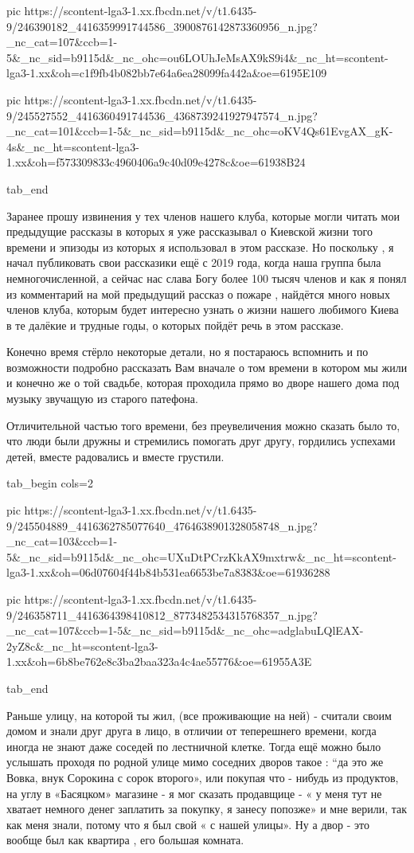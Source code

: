      pic https://scontent-lga3-1.xx.fbcdn.net/v/t1.6435-9/246390182_4416359991744586_3900876142873360956_n.jpg?_nc_cat=107&ccb=1-5&_nc_sid=b9115d&_nc_ohc=ou6LOUhJeMsAX9kS9i4&_nc_ht=scontent-lga3-1.xx&oh=c1f9fb4b082bb7e64a6ea28099fa442a&oe=6195E109

     pic https://scontent-lga3-1.xx.fbcdn.net/v/t1.6435-9/245527552_4416360491744536_4368739241927947574_n.jpg?_nc_cat=101&ccb=1-5&_nc_sid=b9115d&_nc_ohc=oKV4Qs61EvgAX_gK-4s&_nc_ht=scontent-lga3-1.xx&oh=f573309833c4960406a9c40d09e4278c&oe=61938B24

  tab_end
\fi

Заранее прошу извинения у тех членов нашего клуба, которые могли читать мои
предыдущие рассказы в которых я  уже  рассказывал о Киевской жизни того времени
и эпизоды из которых я использовал в этом рассказе. Но поскольку , я начал
публиковать свои рассказики ещё с 2019 года, когда наша группа была
немногочисленной, а сейчас нас слава Богу  более 100 тысяч членов и как я понял
из комментарий на мой предыдущий рассказ о пожаре ,  найдётся много новых
членов клуба, которым будет интересно узнать о жизни нашего любимого Киева в те
далёкие и трудные годы, о которых пойдёт речь в этом рассказе.

Конечно время стёрло некоторые детали, но я постараюсь вспомнить и по
возможности  подробно рассказать Вам вначале о том времени в котором мы жили и
конечно же о той свадьбе, которая проходила прямо во дворе нашего дома под
музыку звучащую из старого патефона.

Отличительной частью того времени, без преувеличения можно сказать было то, что
люди были  дружны и стремились помогать друг другу, гордились успехами  детей,
вместе радовались и вместе грустили.

\ifcmt
  tab_begin cols=2

     pic https://scontent-lga3-1.xx.fbcdn.net/v/t1.6435-9/245504889_4416362785077640_4764638901328058748_n.jpg?_nc_cat=103&ccb=1-5&_nc_sid=b9115d&_nc_ohc=UXuDtPCrzKkAX9mxtrw&_nc_ht=scontent-lga3-1.xx&oh=06d07604f44b84b531ea6653be7a8383&oe=61936288

     pic https://scontent-lga3-1.xx.fbcdn.net/v/t1.6435-9/246358711_4416364398410812_8773482534315768357_n.jpg?_nc_cat=107&ccb=1-5&_nc_sid=b9115d&_nc_ohc=adglabuLQlEAX-2yZ8c&_nc_ht=scontent-lga3-1.xx&oh=6b8be762e8c3ba2baa323a4c4ae55776&oe=61955A3E

  tab_end
\fi

Раньше улицу, на которой ты жил, (все проживающие на ней) - считали своим
домом и знали друг друга в лицо, в отличии от теперешнего  времени, когда
иногда  не знают даже соседей по лестничной клетке.  Тогда ещё можно было
услышать проходя по родной улице мимо соседних дворов такое :   “да это же
Вовка, внук Сорокина с сорок второго»,  или покупая  что - нибудь  из
продуктов,  на углу в    «Басяцком» магазине  - я мог сказать продавщице - « у
меня тут не хватает  немного денег  заплатить за покупку, я занесу попозже» и
мне  верили, так как меня знали, потому что я  был свой « с нашей улицы».  Ну а
двор  - это вообще был как  квартира , его большая комната. 

